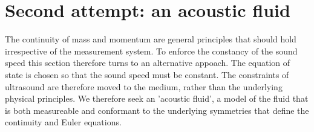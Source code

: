 %
%

\section{Second attempt: an acoustic fluid}\label{sec:incompressibleFluid}

The continuity of mass and momentum are general principles that should hold irrespective of the measurement system.
To enforce the constancy of the sound speed this section therefore turns to an alternative appoach.
The equation of state is chosen so that the sound speed must be constant.
The constraints of ultrasound are therefore moved to the medium, rather than the underlying physical principles.
We therefore seek an 'acoustic fluid',
a model of the fluid that is both measureable and conformant to the underlying symmetries that define the continuity and Euler equations.



